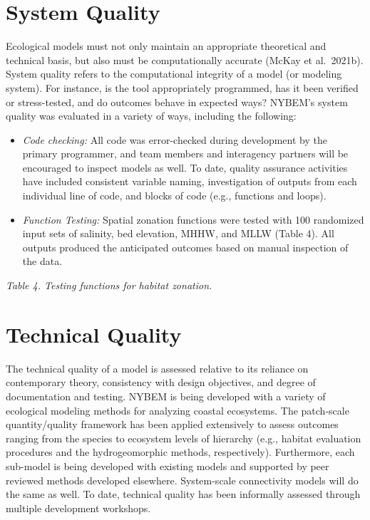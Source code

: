\documentclass[
]{book}
\begin{document}
\hypertarget{system-quality}{%
\section{System Quality}\label{system-quality}}

Ecological models must not only maintain an appropriate theoretical and technical basis, but also must be computationally accurate (McKay et al.~2021b). System quality refers to the computational integrity of a model (or modeling system). For instance, is the tool appropriately programmed, has it been verified or stress-tested, and do outcomes behave in expected ways? NYBEM's system quality was evaluated in a variety of ways, including the following:

\begin{itemize}
\item
  \emph{Code checking:} All code was error-checked during development by the primary programmer, and team members and interagency partners will be encouraged to inspect models as well. To date, quality assurance activities have included consistent variable naming, investigation of outputs from each individual line of code, and blocks of code (e.g., functions and loops).
\item
  \emph{Function Testing:} Spatial zonation functions were tested with 100 randomized input sets of salinity, bed elevation, MHHW, and MLLW (Table 4). All outputs produced the anticipated outcomes based on manual inspection of the data.
\end{itemize}

\emph{Table 4. Testing functions for habitat zonation.}

\hypertarget{technical-quality}{%
\section{Technical Quality}\label{technical-quality}}

The technical quality of a model is assessed relative to its reliance on contemporary theory, consistency with design objectives, and degree of documentation and testing. NYBEM is being developed with a variety of ecological modeling methods for analyzing coastal ecosystems. The patch-scale quantity/quality framework has been applied extensively to assess outcomes ranging from the species to ecosystem levels of hierarchy (e.g., habitat evaluation procedures and the hydrogeomorphic methods, respectively). Furthermore, each sub-model is being developed with existing models and supported by peer reviewed methods developed elsewhere. System-scale connectivity models will do the same as well. To date, technical quality has been informally assessed through multiple development workshops.
\end{document}
